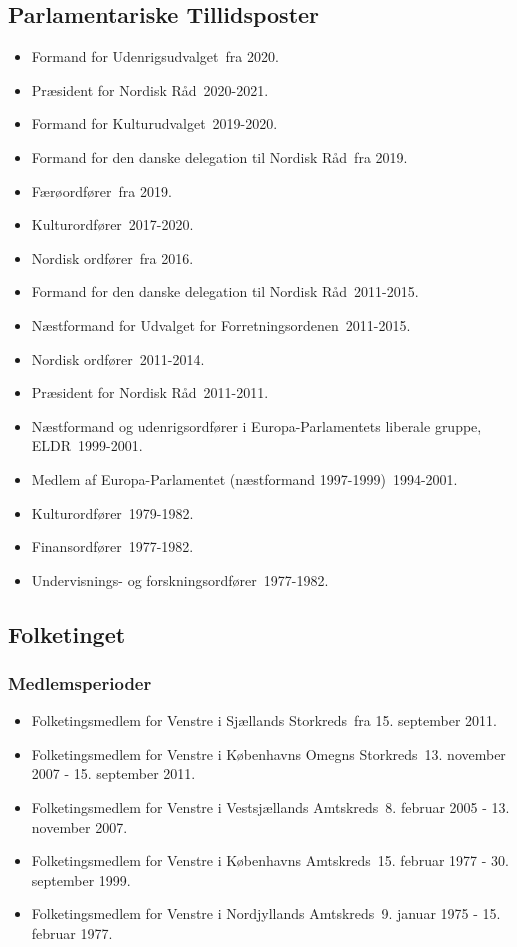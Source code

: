\documentclass[11pt, a4paper]{awesome-cv}
\begin{document}
\begin{cvletter}
\subsection*{Parlamentariske Tillidsposter}
\begin{itemize}
\item Formand for Udenrigsudvalget fra 2020.
\item Præsident for Nordisk Råd 2020-2021.
\item Formand for Kulturudvalget 2019-2020.
\item Formand for den danske delegation til Nordisk Råd fra 2019.
\item Færøordfører fra 2019.
\item Kulturordfører 2017-2020.
\item Nordisk ordfører fra 2016.
\item Formand for den danske delegation til Nordisk Råd 2011-2015.
\item Næstformand for Udvalget for Forretningsordenen 2011-2015.
\item Nordisk ordfører 2011-2014.
\item Præsident for Nordisk Råd 2011-2011.
\item Næstformand og udenrigsordfører i Europa-Parlamentets liberale gruppe, ELDR 1999-2001.
\item Medlem af Europa-Parlamentet (næstformand 1997-1999) 1994-2001.
\item Kulturordfører 1979-1982.
\item Finansordfører 1977-1982.
\item Undervisnings- og forskningsordfører 1977-1982.
\end{itemize}
\subsection*{Folketinget}
\subsubsection*{Medlemsperioder}
\begin{itemize}
\item Folketingsmedlem for Venstre i Sjællands Storkreds fra 15. september 2011.
\item Folketingsmedlem for Venstre i Københavns Omegns Storkreds 13. november 2007 - 15. september 2011.
\item Folketingsmedlem for Venstre i Vestsjællands Amtskreds 8. februar 2005 - 13. november 2007.
\item Folketingsmedlem for Venstre i Københavns Amtskreds 15. februar 1977 - 30. september 1999.
\item Folketingsmedlem for Venstre i Nordjyllands Amtskreds 9. januar 1975 - 15. februar 1977.
\end{itemize}

\end{cvletter}
\end{document}
